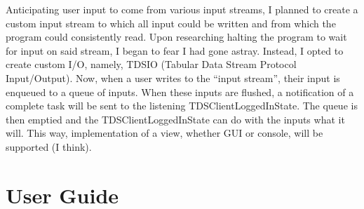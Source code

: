 \documentclass{article}
\begin{document}
        Anticipating user input to come from various input streams, I planned to create a custom input stream to which all input could be written and from which the program could consistently read. Upon researching halting the program to wait for input on said stream, I began to fear I had gone astray. Instead, I opted to create custom I/O, namely, TDSIO (Tabular Data Stream Protocol Input/Output). Now, when a user writes to the ``input stream'', their input is enqueued to a queue of inputs. When these inputs are flushed, a notification of a complete task will be sent to the listening TDSClientLoggedInState. The queue is then emptied and the TDSClientLoggedInState can do with the inputs what it will. This way, implementation of a view, whether GUI or console, will be supported (I think).

\section{User Guide}\label{sec:userguide}
\end{document}
